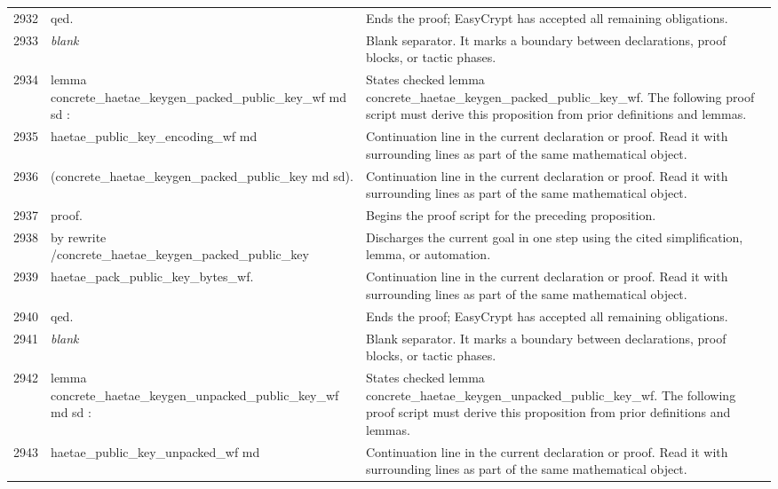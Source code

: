 \documentclass[10pt]{article}
\begin{document}
\begin{longtable}{r L{0.53\textwidth} L{0.37\textwidth}}
2932 & {\ttfamily\scriptsize qed.} & Ends the proof; EasyCrypt has accepted all remaining obligations. \\
2933 & {\ttfamily\scriptsize \emph{blank}} & Blank separator.  It marks a boundary between declarations, proof blocks, or tactic phases. \\
2934 & {\ttfamily\scriptsize lemma concrete\_haetae\_keygen\_packed\_public\_key\_wf md sd :} & States checked lemma concrete\_haetae\_keygen\_packed\_public\_key\_wf.  The following proof script must derive this proposition from prior definitions and lemmas. \\
2935 & {\ttfamily\scriptsize   haetae\_public\_key\_encoding\_wf md} & Continuation line in the current declaration or proof.  Read it with surrounding lines as part of the same mathematical object. \\
2936 & {\ttfamily\scriptsize     (concrete\_haetae\_keygen\_packed\_public\_key md sd).} & Continuation line in the current declaration or proof.  Read it with surrounding lines as part of the same mathematical object. \\
2937 & {\ttfamily\scriptsize proof.} & Begins the proof script for the preceding proposition. \\
2938 & {\ttfamily\scriptsize by rewrite /concrete\_haetae\_keygen\_packed\_public\_key} & Discharges the current goal in one step using the cited simplification, lemma, or automation. \\
2939 & {\ttfamily\scriptsize            haetae\_pack\_public\_key\_bytes\_wf.} & Continuation line in the current declaration or proof.  Read it with surrounding lines as part of the same mathematical object. \\
2940 & {\ttfamily\scriptsize qed.} & Ends the proof; EasyCrypt has accepted all remaining obligations. \\
2941 & {\ttfamily\scriptsize \emph{blank}} & Blank separator.  It marks a boundary between declarations, proof blocks, or tactic phases. \\
2942 & {\ttfamily\scriptsize lemma concrete\_haetae\_keygen\_unpacked\_public\_key\_wf md sd :} & States checked lemma concrete\_haetae\_keygen\_unpacked\_public\_key\_wf.  The following proof script must derive this proposition from prior definitions and lemmas. \\
2943 & {\ttfamily\scriptsize   haetae\_public\_key\_unpacked\_wf md} & Continuation line in the current declaration or proof.  Read it with surrounding lines as part of the same mathematical object. \\

\end{longtable}
\end{document}
